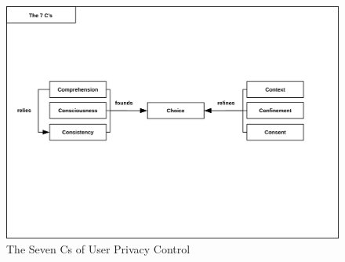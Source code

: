 \begin{figure}
\centering
\includegraphics[width=\textwidth]{diagrams/png/The7Cs.png}
\caption{The Seven Cs of User Privacy Control}
\label{figure:The Seven Cs of User Privacy Control}
\end{figure}

